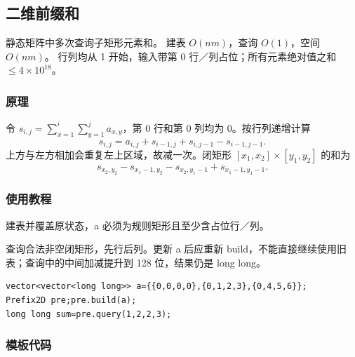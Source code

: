 \subsection{二维前缀和}
\label{other:prefix-2d}
\AlgorithmInfo
    {静态矩阵中多次查询子矩形元素和。}
    {建表 $O(nm)$，查询 $O(1)$，空间 $O(nm)$。}
    {行列均从 1 开始，输入带第 0 行／列占位；所有元素绝对值之和 $\le4\times10^{18}$。}
\subsubsection*{原理}
令 $s_{i,j}=\sum_{x=1}^i\sum_{y=1}^j a_{x,y}$，第 0 行和第 0 列均为 0。按行列递增计算
\[
 s_{i,j}=a_{i,j}+s_{i-1,j}+s_{i,j-1}-s_{i-1,j-1}.
\]
上方与左方相加会重复左上区域，故减一次。闭矩形 $[x_1,x_2]\times[y_1,y_2]$ 的和为
\[
 s_{x_2,y_2}-s_{x_1-1,y_2}-s_{x_2,y_1-1}+s_{x_1-1,y_1-1}.
\]
\subsubsection*{使用教程}
 建表并覆盖原状态，a 必须为规则矩形且至少含占位行／列。

 查询合法非空闭矩形，先行后列。更新 a 后应重新 build，不能直接继续使用旧表；查询中的中间加减提升到 128 位，结果仍是 long long。
\begin{lstlisting}[style=mtycpp,numbers=none]
vector<vector<long long>> a={{0,0,0,0},{0,1,2,3},{0,4,5,6}};
Prefix2D pre;pre.build(a);
long long sum=pre.query(1,2,2,3);
\end{lstlisting}
\subsubsection*{模板代码}
